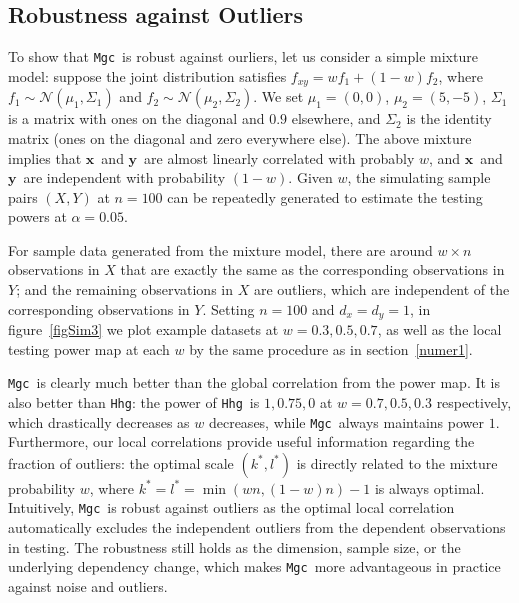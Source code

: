 \documentclass[11pt]{article}
\newcommand{\note}[2][]{\added[#1,remark={#2}]{}}
\providecommand{\sct}[1]{{\sc \texttt{#1}}}
\providecommand{\mb}[1]{\boldsymbol{#1}}
\providecommand{\mc}[1]{\mathcal{#1}}
\newcommand{\T}{^{\ensuremath{\mathsf{T}}}}           %
\newcommand{\Mgc}{\sct{Mgc}}
\newcommand{\Hhg}{\sct{Hhg}}
\newcommand{\jovo}[1]{{\note{jv: #1}}}
\newcommand{\cs}[1]{{\note{cs: #1}}}
\newcommand{\mbx}{\ensuremath{\mb{x}}}
\newcommand{\mby}{\ensuremath{\mb{y}}}
\begin{document}
\subsection{Robustness against Outliers}
\label{main4}
To show that \Mgc~is robust against ourliers, let us consider a simple mixture model: suppose the joint distribution satisfies $f_{xy}=w f_{1}+(1-w) f_{2}$, where $f_{1} \sim \mc{N}(\mu_{1},\Sigma_{1})$ and $f_{2} \sim \mc{N}(\mu_{2},\Sigma_{2})$. We set $\mu_{1}=(0,0)$, $\mu_{2}=(5,-5)$, $\Sigma_{1}$ is a matrix with ones on the diagonal and $0.9$ elsewhere, 
 and $\Sigma_{2}$ is the identity matrix (ones on the diagonal and zero everywhere else). 
 The above mixture implies that \mbx~and \mby~are almost linearly correlated with probably $w$, and \mbx~and \mby~are independent with probability $(1-w)$. Given $w$, the simulating sample pairs $(X,Y)$ at $n=100$ can be repeatedly generated to estimate the testing powers at $\alpha=0.05$. 

For sample data generated from the mixture model, there are around $w \times n$ observations in $X$ that are exactly the same as the corresponding observations in $Y$; and the remaining observations in $X$ are outliers, which are independent of the corresponding observations in $Y$. Setting $n=100$ and $d_{x}=d_{y}=1$, in figure~\ref{figSim3} we plot example datasets at $w=0.3, 0.5, 0.7$, as well as the local testing power map at each $w$ by the same procedure as in section~\ref{numer1}. 

\Mgc~is clearly much better than the global correlation from the power map. It is also better than \Hhg: the power of \Hhg~is $1, 0.75,0$ at $w=0.7,0.5,0.3$ respectively, which drastically decreases as $w$ decreases, while \Mgc~always maintains power $1$. Furthermore, our local correlations provide useful information regarding the fraction of outliers: the optimal scale $(k^{*},l^{*})$ is directly related to the mixture probability $w$, where $k^{*}=l^{*}=\min(wn,(1-w)n)-1$ is always optimal. Intuitively, \Mgc~is robust against outliers as the optimal local correlation automatically excludes the independent outliers from the dependent observations in testing. The robustness still holds as the dimension, sample size, or the underlying dependency change, which makes \Mgc~more advantageous in practice against noise and outliers. 
\jovo{explicilty mention that we discover the fraction of outliers.  and the other don't} \cs{ADDED!}
\end{document}
